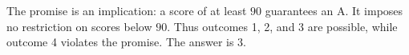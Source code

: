 The promise is an implication: a score of at least $90$ guarantees an A. It imposes no restriction on scores below $90$. Thus outcomes 1, 2, and 3 are possible, while outcome 4 violates the promise. The answer is $\boxed{3}$.
